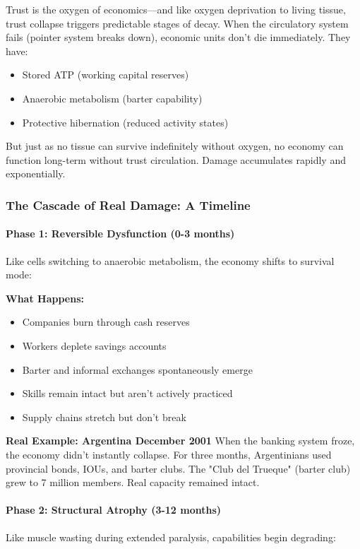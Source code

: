 \documentclass[11pt,oneside]{book}
\begin{document}
Trust is the oxygen of economics—and like oxygen deprivation to living tissue, trust collapse triggers predictable stages of decay. When the circulatory system fails (pointer system breaks down), economic units don't die immediately. They have:
\begin{itemize}
\item Stored ATP (working capital reserves)
\item Anaerobic metabolism (barter capability)
\item Protective hibernation (reduced activity states)
\end{itemize}

But just as no tissue can survive indefinitely without oxygen, no economy can function long-term without trust circulation. Damage accumulates rapidly and exponentially.

\subsubsection{The Cascade of Real Damage: A Timeline}

\paragraph{Phase 1: Reversible Dysfunction (0-3 months)}
Like cells switching to anaerobic metabolism, the economy shifts to survival mode:

\textbf{What Happens:}
\begin{itemize}
\item Companies burn through cash reserves
\item Workers deplete savings accounts
\item Barter and informal exchanges spontaneously emerge
\item Skills remain intact but aren't actively practiced
\item Supply chains stretch but don't break
\end{itemize}

\textbf{Real Example: Argentina December 2001}
When the banking system froze, the economy didn't instantly collapse. For three months, Argentinians used provincial bonds, IOUs, and barter clubs. The "Club del Trueque" (barter club) grew to 7 million members. Real capacity remained intact.

\paragraph{Phase 2: Structural Atrophy (3-12 months)}
Like muscle wasting during extended paralysis, capabilities begin degrading:
\end{document}
